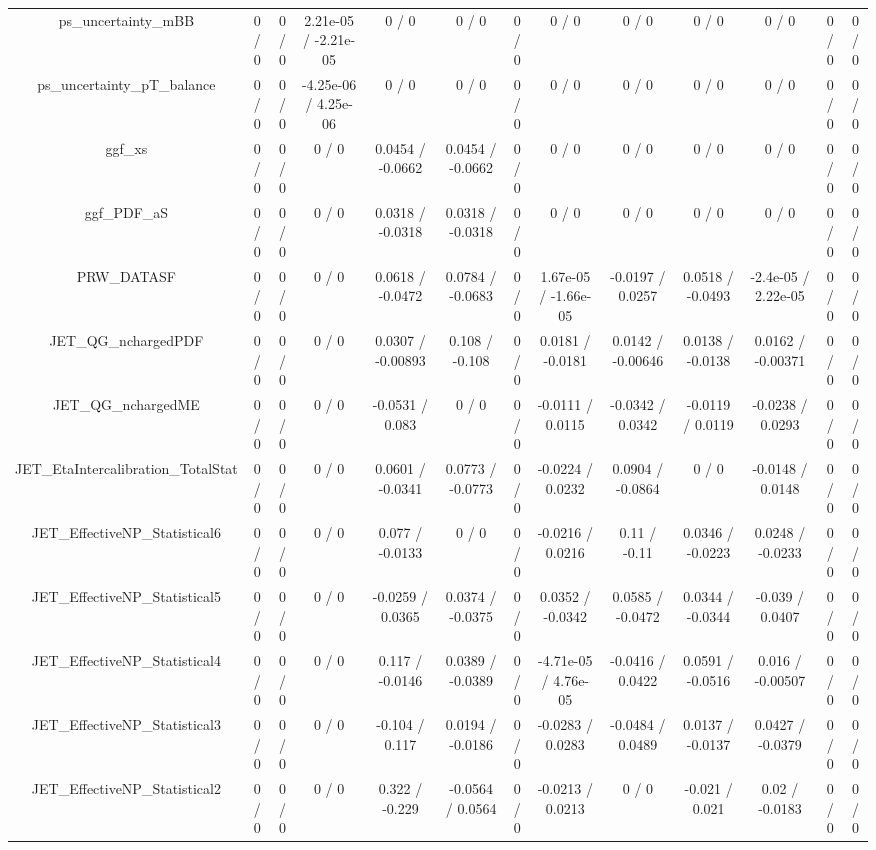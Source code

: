 \documentclass[10pt]{article}
\begin{document}
\begin{table}[htbp]
\begin{center}
\begin{tabular}{|c|c|c|c|c|c|c|c|c|c|c|c|c|}
  ps_uncertainty_mBB & 0 / 0 & 0 / 0 & 2.21e-05 / -2.21e-05 & 0 / 0 & 0 / 0 & 0 / 0 & 0 / 0 & 0 / 0 & 0 / 0 & 0 / 0 & 0 / 0 & 0 / 0 \\ 
  ps_uncertainty_pT_balance & 0 / 0 & 0 / 0 & -4.25e-06 / 4.25e-06 & 0 / 0 & 0 / 0 & 0 / 0 & 0 / 0 & 0 / 0 & 0 / 0 & 0 / 0 & 0 / 0 & 0 / 0 \\ 
  ggf_xs & 0 / 0 & 0 / 0 & 0 / 0 & 0.0454 / -0.0662 & 0.0454 / -0.0662 & 0 / 0 & 0 / 0 & 0 / 0 & 0 / 0 & 0 / 0 & 0 / 0 & 0 / 0 \\ 
  ggf_PDF_aS & 0 / 0 & 0 / 0 & 0 / 0 & 0.0318 / -0.0318 & 0.0318 / -0.0318 & 0 / 0 & 0 / 0 & 0 / 0 & 0 / 0 & 0 / 0 & 0 / 0 & 0 / 0 \\ 
  PRW_DATASF & 0 / 0 & 0 / 0 & 0 / 0 & 0.0618 / -0.0472 & 0.0784 / -0.0683 & 0 / 0 & 1.67e-05 / -1.66e-05 & -0.0197 / 0.0257 & 0.0518 / -0.0493 & -2.4e-05 / 2.22e-05 & 0 / 0 & 0 / 0 \\ 
  JET_QG_nchargedPDF & 0 / 0 & 0 / 0 & 0 / 0 & 0.0307 / -0.00893 & 0.108 / -0.108 & 0 / 0 & 0.0181 / -0.0181 & 0.0142 / -0.00646 & 0.0138 / -0.0138 & 0.0162 / -0.00371 & 0 / 0 & 0 / 0 \\ 
  JET_QG_nchargedME & 0 / 0 & 0 / 0 & 0 / 0 & -0.0531 / 0.083 & 0 / 0 & 0 / 0 & -0.0111 / 0.0115 & -0.0342 / 0.0342 & -0.0119 / 0.0119 & -0.0238 / 0.0293 & 0 / 0 & 0 / 0 \\ 
  JET_EtaIntercalibration_TotalStat & 0 / 0 & 0 / 0 & 0 / 0 & 0.0601 / -0.0341 & 0.0773 / -0.0773 & 0 / 0 & -0.0224 / 0.0232 & 0.0904 / -0.0864 & 0 / 0 & -0.0148 / 0.0148 & 0 / 0 & 0 / 0 \\ 
  JET_EffectiveNP_Statistical6 & 0 / 0 & 0 / 0 & 0 / 0 & 0.077 / -0.0133 & 0 / 0 & 0 / 0 & -0.0216 / 0.0216 & 0.11 / -0.11 & 0.0346 / -0.0223 & 0.0248 / -0.0233 & 0 / 0 & 0 / 0 \\ 
  JET_EffectiveNP_Statistical5 & 0 / 0 & 0 / 0 & 0 / 0 & -0.0259 / 0.0365 & 0.0374 / -0.0375 & 0 / 0 & 0.0352 / -0.0342 & 0.0585 / -0.0472 & 0.0344 / -0.0344 & -0.039 / 0.0407 & 0 / 0 & 0 / 0 \\ 
  JET_EffectiveNP_Statistical4 & 0 / 0 & 0 / 0 & 0 / 0 & 0.117 / -0.0146 & 0.0389 / -0.0389 & 0 / 0 & -4.71e-05 / 4.76e-05 & -0.0416 / 0.0422 & 0.0591 / -0.0516 & 0.016 / -0.00507 & 0 / 0 & 0 / 0 \\ 
  JET_EffectiveNP_Statistical3 & 0 / 0 & 0 / 0 & 0 / 0 & -0.104 / 0.117 & 0.0194 / -0.0186 & 0 / 0 & -0.0283 / 0.0283 & -0.0484 / 0.0489 & 0.0137 / -0.0137 & 0.0427 / -0.0379 & 0 / 0 & 0 / 0 \\ 
  JET_EffectiveNP_Statistical2 & 0 / 0 & 0 / 0 & 0 / 0 & 0.322 / -0.229 & -0.0564 / 0.0564 & 0 / 0 & -0.0213 / 0.0213 & 0 / 0 & -0.021 / 0.021 & 0.02 / -0.0183 & 0 / 0 & 0 / 0 \\ 

\end{tabular}
\end{center}
\end{table}
\end{document}
